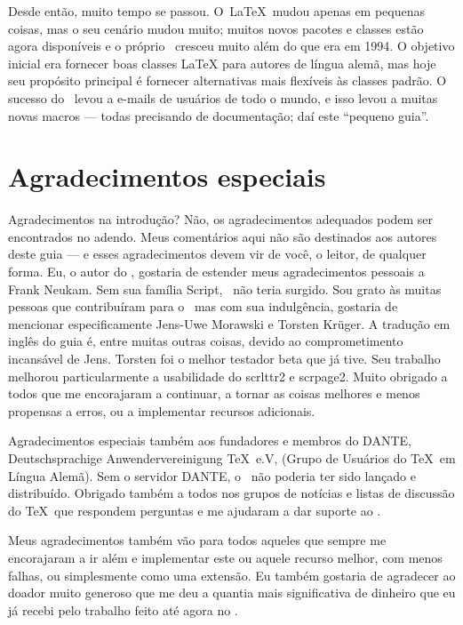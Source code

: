 Desde então, muito tempo se passou. O\ LaTeX\ mudou apenas em pequenas coisas, mas o seu cenário mudou muito; muitos novos pacotes e classes estão agora disponíveis e o próprio \KOMAScript\ cresceu muito além do que era em 1994. O objetivo inicial era fornecer boas classes LaTeX para autores de língua alemã, mas hoje seu propósito principal é fornecer alternativas mais flexíveis às classes padrão. O sucesso do \KOMAScript\ levou a e-mails de usuários de todo o mundo, e isso levou a muitas novas macros — todas precisando de documentação; daí este “pequeno guia”.

\section{Agradecimentos especiais}
Agradecimentos na introdução? Não, os agradecimentos adequados podem ser encontrados no adendo. Meus comentários aqui não são destinados aos autores deste guia — e esses agradecimentos devem vir de você, o leitor, de qualquer forma. Eu, o autor do \KOMAScript, gostaria de estender meus agradecimentos pessoais a Frank Neukam. Sem sua família Script, \KOMAScript\ não teria surgido. Sou grato às muitas pessoas que contribuíram para o \KOMAScript\, mas com sua indulgência, gostaria de mencionar especificamente Jens-Uwe Morawski e Torsten Krüger. A tradução em inglês do guia é, entre muitas outras coisas, devido ao comprometimento incansável de Jens. Torsten foi o melhor testador beta que já tive. Seu trabalho melhorou particularmente a usabilidade do scrlttr2 e scrpage2. Muito obrigado a todos que me encorajaram a continuar, a tornar as coisas melhores e menos propensas a erros, ou a implementar recursos adicionais.

Agradecimentos especiais também aos fundadores e membros do DANTE, Deutschsprachige Anwendervereinigung \TeX\ e.V, (Grupo de Usuários do \TeX\ em Língua Alemã). Sem o servidor DANTE, o \KOMAScript\ não poderia ter sido lançado e distribuído. Obrigado também a todos nos grupos de notícias e listas de discussão do \TeX\ que respondem perguntas e me ajudaram a dar suporte ao \KOMAScript.

Meus agradecimentos também vão para todos aqueles que sempre me encorajaram a ir além e implementar este ou aquele recurso melhor, com menos falhas, ou simplesmente como uma extensão. Eu também gostaria de agradecer ao doador muito generoso que me deu a quantia mais significativa de dinheiro que eu já recebi pelo trabalho feito até agora no \KOMAScript.
